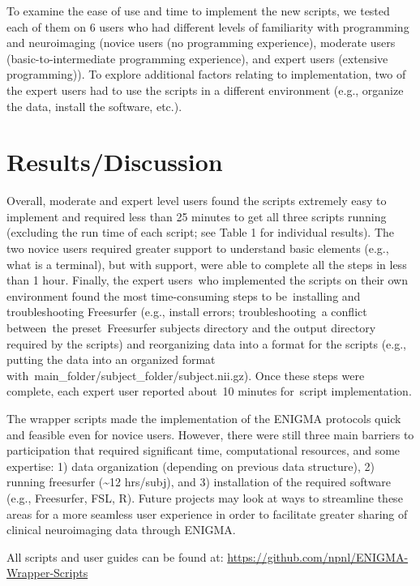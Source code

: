 \documentclass[twocolumn]{bmcart}%
\begin{document}
To examine the ease of use and time to implement the new scripts, we
tested each of them on 6 users who had different levels of familiarity
with programming and neuroimaging (novice users (no programming
experience), moderate users (basic-to-intermediate programming
experience), and expert users (extensive programming)). To explore
additional factors relating to implementation, two of the expert users
had to use the scripts in a different environment (e.g., organize the
data, install the software, etc.).

\section{Results/Discussion}\label{resultsdiscussion}

Overall, moderate and expert level users found the scripts extremely
easy to implement and required less than 25 minutes to get all three
scripts running (excluding the run time of each script; see Table 1 for
individual results). The two novice users required greater support to
understand basic elements (e.g., what is a terminal), but with support,
were able to complete all the steps in less than 1 hour. Finally, the expert users who implemented the scripts on their own environment found the most time-consuming steps to be installing and troubleshooting Freesurfer (e.g., install errors; troubleshooting a conflict between the preset Freesurfer subjects directory and the output directory required by the scripts) and reorganizing data into a format for the scripts (e.g., putting the data into an organized format with main_folder/subject_folder/subject.nii.gz). Once these steps were complete, each expert user reported about 10 minutes for script implementation.


The wrapper scripts made the implementation of the ENIGMA protocols
quick and feasible even for novice users. However, there were still
three main barriers to participation that required significant time,
computational resources, and some expertise: 1) data organization
(depending on previous data structure), 2) running freesurfer
(\textasciitilde{}12 hrs/subj), and 3) installation of the required
software (e.g., Freesurfer, FSL, R). Future projects may look at ways to
streamline these areas for a more seamless user experience in order to
facilitate greater sharing of clinical neuroimaging data through ENIGMA.

All scripts and user guides can be found at:
\url{https://github.com/npnl/ENIGMA-Wrapper-Scripts}
\end{document}
